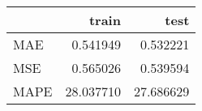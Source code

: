 \begin{tabular}{lrr}
\toprule
{} &      train &       test \\
\midrule
MAE  &   0.541949 &   0.532221 \\
MSE  &   0.565026 &   0.539594 \\
MAPE &  28.037710 &  27.686629 \\
\bottomrule
\end{tabular}
